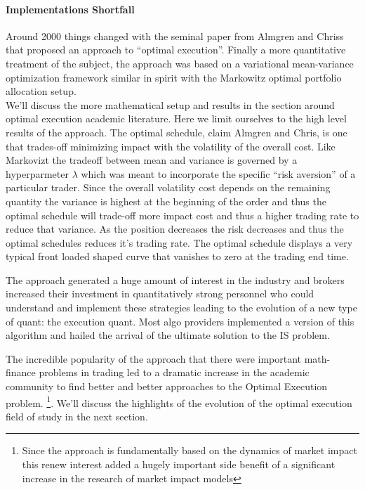 \paragraph{Implementations Shortfall}
Around 2000 things changed with the seminal paper from Almgren and Chriss ~\cite{alm2000} that proposed an approach to ``optimal execution''. Finally a more quantitative treatment of the subject, the approach was based on a variational  mean-variance optimization framework similar in spirit with the Markowitz optimal portfolio allocation setup. \\
We'll discuss the more mathematical setup and results in the section around optimal execution academic literature. Here we limit ourselves to the high level results of the approach.
The optimal schedule, claim Almgren and Chris, is one that trades-off minimizing impact with the volatility of the overall cost. Like Markovizt the tradeoff between mean and variance is governed by a hyperparmeter $\lambda$ which was meant to incorporate the specific ``risk aversion'' of a particular trader. Since the overall volatility cost depends on the remaining quantity the variance is highest at the beginning of the order and thus the optimal schedule will trade-off more impact cost and thus a higher trading rate to reduce that variance. As the position decreases the risk decreases and thus the optimal schedules reduces it's trading rate. The optimal schedule displays a very typical front loaded shaped curve that vanishes to zero at the trading end time.

The approach generated a huge amount of interest in the industry and  brokers increased their investment in quantitatively strong personnel who could understand and implement these strategies leading to the evolution of a new type of quant: the execution quant. Most algo providers implemented a version of this algorithm and hailed the arrival of the ultimate solution to the IS problem. 

The incredible popularity of the approach that there were important math-finance problems in trading led to a dramatic increase in the academic community to find better and better approaches to the Optimal Execution problem. \footnote{Since the approach is fundamentally based on the dynamics of market impact this renew interest added  a hugely important side benefit of a significant increase in the research of market impact models}. We'll discuss the highlights of the evolution of the optimal execution field of study in the next section. \\

